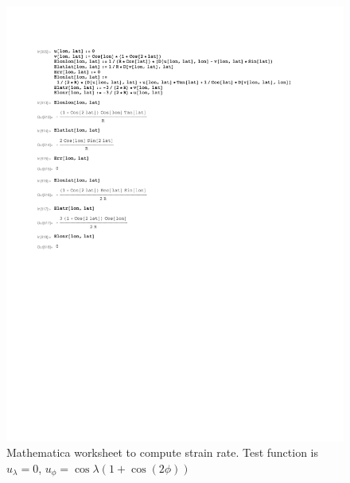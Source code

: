 \documentclass[11pt]{report}
\begin{document}
\begin{figure}[htbp]
 \center
 \includegraphics[scale=0.8, trim = 0 4in 0 0, clip]{f/130520_v_coscos.pdf}
 \caption{Mathematica worksheet to compute strain rate.  Test function is $u_{\lambda}=0$, $u_{\phi}=\cos \lambda (1+\cos(2\phi))$}
 \label{fig:mathematica2}
\end{figure}
\end{document}

